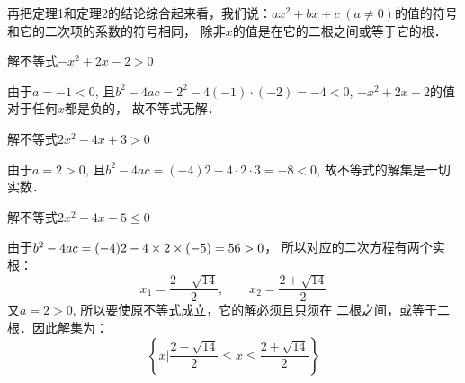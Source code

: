 \begin{center}
\end{center}

再把定理1和定理2的结论综合起来看，我们说：$ax^2+
bx+c\; (a\ne 0)$的值的符号和它的二次项的系数的符号相同，
除非$x$的值是在它的二根之间或等于它的根．



\begin{example}
 解不等式$-x^2+2x-2>0$
\end{example}

\begin{solution}
 由于$a=-1<0$, 且$b^2-4ac=2^2-4(-1)\cdot(-2)=-4<0$, $-x^2+2x-2$的值对于任何$x$都是负的，
故不等式无解．   
\end{solution}

\begin{example}
   解不等式$2x^2-4x+3>0$ 
\end{example}

\begin{solution}
    由于$a=2>0$, 且$b^2-4ac=(-4)2-4\cdot 2\cdot 3=-8<0$, 故不等式的解集是一切实数．
\end{solution}

\begin{example}
 解不等式$2x^2-4x-5\le 0$   
\end{example}

\begin{solution}
    由于$b^2-4ac=(-4)2-4\times2\times(-5)=56>0$，
所以对应的二次方程有两个实根：
\[x_1=\frac{2-\sqrt{14}}{2},\qquad x_2=\frac{2+\sqrt{14}}{2}\]
又$a=2>0$, 所以要使原不等式成立，它的解必须且只须在
二根之间，或等于二根．因此解集为：
\[\left\{x\Big|\frac{2-\sqrt{14}}{2}\le x\le \frac{2+\sqrt{14}}{2} \right\}\]
\end{solution}

